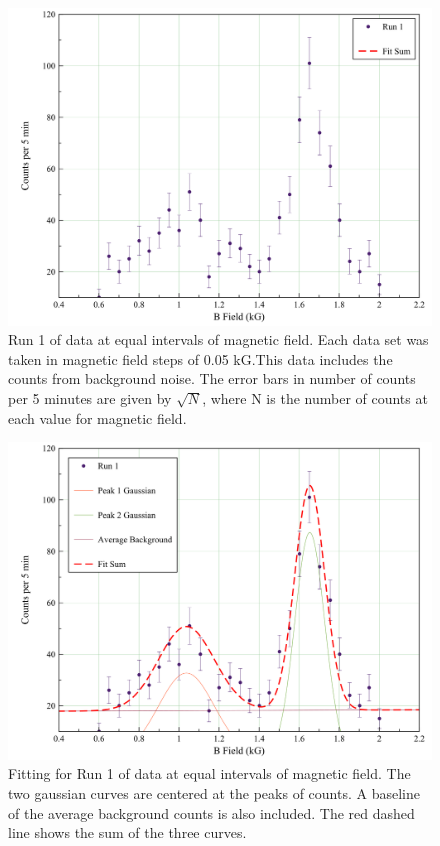 \begin{figure}[H]
\begin{center}
\includegraphics[width=4 in]{run1_raw.png}
\caption{Run 1 of data at equal intervals of magnetic field. Each data set was taken in magnetic field steps of 0.05 kG.This data includes the counts from background noise. The error bars in number of counts per 5 minutes are given by $\sqrt{N}$, where N is the number of counts at each value for magnetic field. }
\end{center}
\end{figure}

\begin{figure}[H]
\begin{center}
\includegraphics[width=4 in]{run1_all.png}
\caption{Fitting for Run 1 of data at equal intervals of magnetic field. The two gaussian curves are centered at the peaks of counts. A baseline of the average background counts is also included. The red dashed line shows the sum of the three curves.}
\end{center}
\end{figure}

